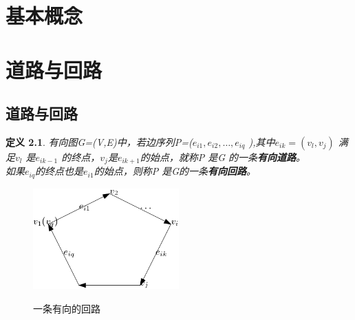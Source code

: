 \documentclass[11pt,a4paper,openany]{book}
\newtheorem{defination}{\textbf{定义}}[section]
\begin{document}
\pagestyle{plain}  %
\chapter{基本概念}
\chapter{道路与回路}
\section{道路与回路}
\begin{defination}\K 有向图G=(V,E)中，若边序列P=($e_{i1},e_{i2},\dots,e_{iq}$ ),其中$e_{ik}=(v_l,v_j )$ 满足$v_l$ 是$e_{ik-1}$ 的终点，$v_j$是$e_{ik+1}$的始点，就称P 是G 的一条\textbf{有向道路}。\\ 如果$e_{iq}$的终点也是$e_{i1}$的始点，则称P 是G的一条\textbf{有向回路}。
\end{defination}
\begin{figure}[H]
  \centering
  \includegraphics[width=0.5\textwidth]{2.1.1.png}\\
  \caption*{一条有向的回路}
\end{figure}
\end{document}

